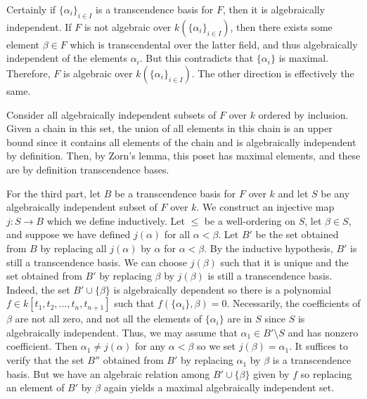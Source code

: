 \documentclass[../../master.tex]{subfiles}
\begin{document}
\begin{solution}
    Certainly if $\{\alpha_i\}_{i \in I}$ is a transcendence basis for $F$, then it is algebraically independent.
    If $F$ is not algebraic over $k(\{\alpha_i\}_{i \in I})$, then there exists some element $\beta \in F$ which is transcendental over the latter field, and thus algebraically independent of the elements $\alpha_i$.
    But this contradicts that $\{\alpha_i\}$ is maximal. 
    Therefore, $F$ is algebraic over $k(\{\alpha_i\}_{i \in I})$.
    The other direction is effectively the same.

    Consider all algebraically independent subsets of $F$ over $k$ ordered by inclusion.
    Given a chain in this set, the union of all elements in this chain is an upper bound since it contains all elements of the chain and is algebraically independent by definition.
    Then, by Zorn's lemma, this poset has maximal elements, and these are by definition transcendence bases.

    For the third part, let $B$ be a transcendence basis for $F$ over $k$ and let $S$ be any algebraically independent subset of $F$ over $k$.
    We construct an injective map $j: S \to B$ which we define inductively.
    Let $\leq$ be a well-ordering on $S$, let $\beta \in S$, and suppose we have defined $j(\alpha)$ for all $\alpha < \beta$.
    Let $B'$ be the set obtained from $B$ by replacing all $j(\alpha)$ by $\alpha$ for $\alpha < \beta$.
    By the inductive hypothesis, $B'$ is still a transcendence basis.
    We can choose $j(\beta)$ such that it is unique and the set obtained from $B'$ by replacing $\beta$ by $j(\beta)$ is still a transcendence basis.
    Indeed, the set $B' \cup \{\beta\}$ is algebraically dependent so there is a polynomial $f \in k[t_1, t_2, \ldots, t_n, t_{n+1}]$ such that $f(\{\alpha_i\}, \beta) = 0$.
    Necessarily, the coefficients of $\beta$ are not all zero, and not all the elements of $\{\alpha_i\}$ are in $S$ since $S$ is algebraically independent.
    Thus, we may assume that $\alpha_1 \in B' \setminus S$ and has nonzero coefficient.
    Then $\alpha_1 \neq j(\alpha)$ for any $\alpha < \beta$ so we set $j(\beta) = \alpha_1$.
    It suffices to verify that the set $B''$ obtained from $B'$ by replacing $\alpha_1$ by $\beta$ is a transcendence basis.
    But we have an algebraic relation among $B' \cup \{\beta\}$ given by $f$ so replacing an element of $B'$ by $\beta$ again yields a maximal algebraically independent set.
\end{solution}
\end{document}
